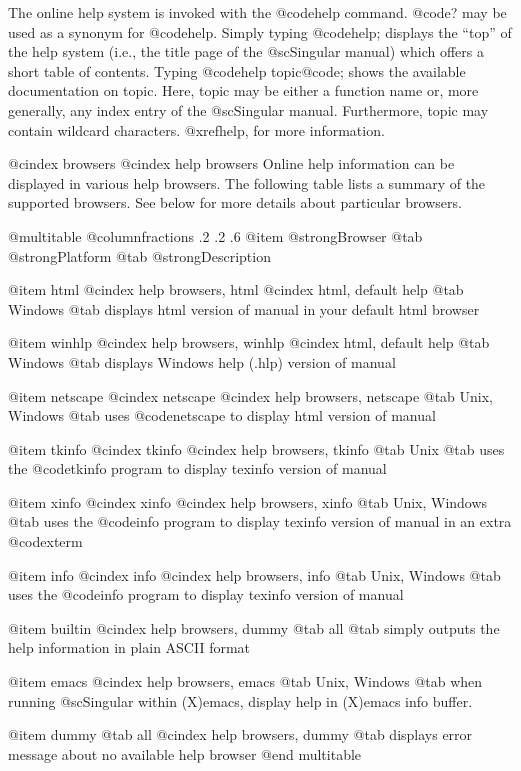 The online help system is invoked with the @code{help} command.
@code{?} may be used as a synonym for @code{help}.  Simply typing
@code{help;} displays the ``top'' of the help system (i.e., the title
page of the @sc{Singular} manual) which offers a
short table of contents.  Typing @code{help} topic@code{;} shows the
available documentation on topic.  Here, topic may be either a function
name or, more generally, any index entry of the @sc{Singular}
manual. Furthermore, topic may contain wildcard characters.
@xref{help}, for more information.

@cindex browsers
@cindex help browsers
Online help information can be displayed in various help browsers. The
following table lists a summary of the supported browsers. See below for
more details about particular browsers.

@multitable @columnfractions .2 .2 .6
@item @strong{Browser} @tab @strong{Platform}
@tab @strong{Description}

@item html
@cindex help browsers, html
@cindex html, default help
@tab Windows
@tab displays html version of manual in your default html browser

@item winhlp
@cindex help browsers, winhlp
@cindex html, default help
@tab Windows
@tab displays Windows help (.hlp) version of manual

@item netscape
@cindex netscape
@cindex help browsers, netscape
@tab Unix, Windows
@tab uses @code{netscape} to display html version of manual

@item tkinfo
@cindex tkinfo
@cindex help browsers, tkinfo
@tab Unix
@tab uses the @code{tkinfo} program to display texinfo version of manual

@item xinfo
@cindex xinfo
@cindex help browsers, xinfo
@tab Unix, Windows
@tab uses the @code{info} program to display texinfo version of manual in an
extra @code{xterm}

@item info
@cindex info
@cindex help browsers, info
@tab Unix, Windows
@tab uses the @code{info} program to display texinfo version of manual

@item builtin
@cindex help browsers, dummy
@tab all
@tab simply outputs the help information in plain ASCII format

@item emacs
@cindex help browsers, emacs
@tab Unix, Windows
@tab when running @sc{Singular} within (X)emacs, display help in
(X)emacs info buffer.

@item dummy
@tab all
@cindex help browsers, dummy
@tab displays error message about no available help browser
@end multitable

